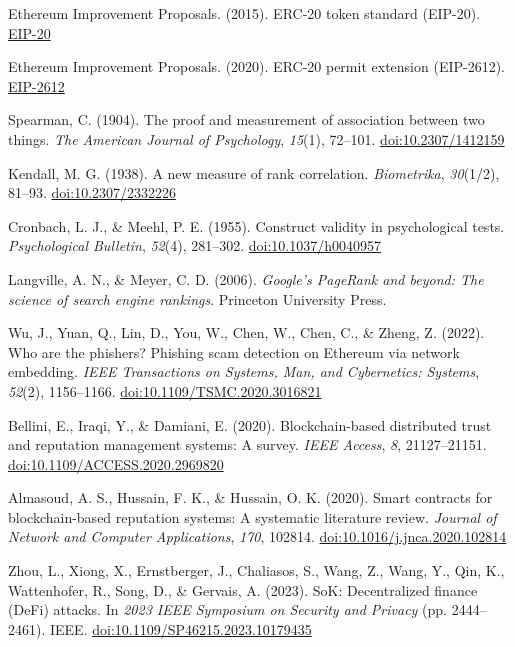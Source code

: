 \begin{enumerate}[label={[\arabic*]}, leftmargin=*, itemsep=0.35em, parsep=0pt]
  \item{}\label{ref:18} Ethereum Improvement Proposals. (2015). ERC-20 token standard (EIP-20). \href{https://eips.ethereum.org/EIPS/eip-20}{EIP-20}
  \item{}\label{ref:19} Ethereum Improvement Proposals. (2020). ERC-20 permit extension (EIP-2612). \href{https://eips.ethereum.org/EIPS/eip-2612}{EIP-2612}
  \item{}\label{ref:20} Spearman, C. (1904). The proof and measurement of association between two things. \textit{The American Journal of Psychology}, \textit{15}(1), 72--101. \href{https://doi.org/10.2307/1412159}{doi:10.2307/1412159}
  \item{}\label{ref:21} Kendall, M. G. (1938). A new measure of rank correlation. \textit{Biometrika}, \textit{30}(1/2), 81--93. \href{https://doi.org/10.2307/2332226}{doi:10.2307/2332226}
  \item{}\label{ref:22} Cronbach, L. J., \& Meehl, P. E. (1955). Construct validity in psychological tests. \textit{Psychological Bulletin}, \textit{52}(4), 281--302. \href{https://doi.org/10.1037/h0040957}{doi:10.1037/h0040957}
  \item{}\label{ref:23} Langville, A. N., \& Meyer, C. D. (2006). \textit{Google's PageRank and beyond: The science of search engine rankings}. Princeton University Press.
  \item{}\label{ref:24} Wu, J., Yuan, Q., Lin, D., You, W., Chen, W., Chen, C., \& Zheng, Z. (2022). Who are the phishers? Phishing scam detection on Ethereum via network embedding. \textit{IEEE Transactions on Systems, Man, and Cybernetics: Systems}, \textit{52}(2), 1156--1166. \href{https://doi.org/10.1109/TSMC.2020.3016821}{doi:10.1109/TSMC.2020.3016821}
  \item{}\label{ref:25} Bellini, E., Iraqi, Y., \& Damiani, E. (2020). Blockchain-based distributed trust and reputation management systems: A survey. \textit{IEEE Access}, \textit{8}, 21127--21151. \href{https://doi.org/10.1109/ACCESS.2020.2969820}{doi:10.1109/ACCESS.2020.2969820}
  \item{}\label{ref:26} Almasoud, A. S., Hussain, F. K., \& Hussain, O. K. (2020). Smart contracts for blockchain-based reputation systems: A systematic literature review. \textit{Journal of Network and Computer Applications}, \textit{170}, 102814. \href{https://doi.org/10.1016/j.jnca.2020.102814}{doi:10.1016/j.jnca.2020.102814}
  \item{}\label{ref:27} Zhou, L., Xiong, X., Ernstberger, J., Chaliasos, S., Wang, Z., Wang, Y., Qin, K., Wattenhofer, R., Song, D., \& Gervais, A. (2023). SoK: Decentralized finance (DeFi) attacks. In \textit{2023 IEEE Symposium on Security and Privacy} (pp. 2444--2461). IEEE. \href{https://doi.org/10.1109/SP46215.2023.10179435}{doi:10.1109/SP46215.2023.10179435}

\end{enumerate}
